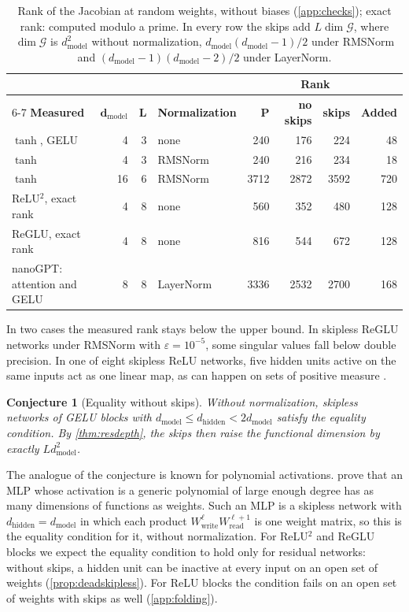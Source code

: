 \documentclass[10pt]{article}
\newtheorem{conjecture}{Conjecture}
\theoremstyle{definition}
\theoremstyle{remark}
\newcommand{\Wread}{W_{\mathrm{read}}}
\newcommand{\Wwrite}{W_{\mathrm{write}}}
\newcommand{\dm}{d_{\mathrm{model}}}
\newcommand{\dhid}{d_{\mathrm{hidden}}}
\newcommand{\G}{\mathcal{G}}
\begin{document}
\begin{table}[b]
\centering\small
\renewcommand{\arraystretch}{1.1}
\begin{tabular}{@{}lrrlrrrr@{}}
\toprule
& & & & & \multicolumn{2}{c}{\textbf{Rank}} & \\
\cmidrule(lr){6-7}
\textbf{Measured} & $\boldsymbol{\dm}$ & $\boldsymbol{L}$ & \textbf{Normalization} & $\boldsymbol{P}$ & \textbf{no skips} & \textbf{skips} & \textbf{Added} \\
\midrule
$\tanh$, GELU & 4 & 3 & none & 240 & 176 & 224 & 48 \\
$\tanh$ & 4 & 3 & RMSNorm & 240 & 216 & 234 & 18 \\
$\tanh$ & 16 & 6 & RMSNorm & 3712 & 2872 & 3592 & 720 \\
ReLU$^2$, exact rank & 4 & 8 & none & 560 & 352 & 480 & 128 \\
ReGLU, exact rank & 4 & 8 & none & 816 & 544 & 672 & 128 \\
nanoGPT: attention and GELU & 8 & 8 & LayerNorm & 3336 & 2532 & 2700 & 168 \\
\bottomrule
\end{tabular}
\caption{Rank of the Jacobian at random weights, without biases (\cref{app:checks}); exact rank: computed modulo a prime. In every row the skips add $L\dim\G$, where $\dim\G$ is $\dm^2$ without normalization, $\dm(\dm-1)/2$ under RMSNorm and $(\dm-1)(\dm-2)/2$ under LayerNorm.}
\label{tab:measured}
\end{table}

In two cases the measured rank stays below the upper bound. In skipless ReGLU networks under RMSNorm with $\varepsilon = 10^{-5}$, some singular values fall below double precision. In one of eight skipless ReLU networks, five hidden units active on the same inputs act as one linear map, as can happen on sets of positive measure \citep{grigsby2023hidden}.

\begin{conjecture}[Equality without skips]\label{conj:equality}
Without normalization, skipless networks of GELU blocks with $\dm \le \dhid < 2\dm$ satisfy the equality condition. By \cref{thm:resdepth}, the skips then raise the functional dimension by exactly $L\dm^2$.
\end{conjecture}

The analogue of the conjecture is known for polynomial activations. \citet[Theorem~4.1]{shahverdi2026razor} prove that an MLP whose activation is a generic polynomial of large enough degree has as many dimensions of functions as weights. Such an MLP is a skipless network with $\dhid = \dm$ in which each product $\Wwrite^{\ell}\Wread^{\ell+1}$ is one weight matrix, so this is the equality condition for it, without normalization. For ReLU$^2$ and ReGLU blocks we expect the equality condition to hold only for residual networks: without skips, a hidden unit can be inactive at every input on an open set of weights (\cref{prop:deadskipless}). For ReLU blocks the condition fails on an open set of weights with skips as well (\cref{app:folding}).
\end{document}
